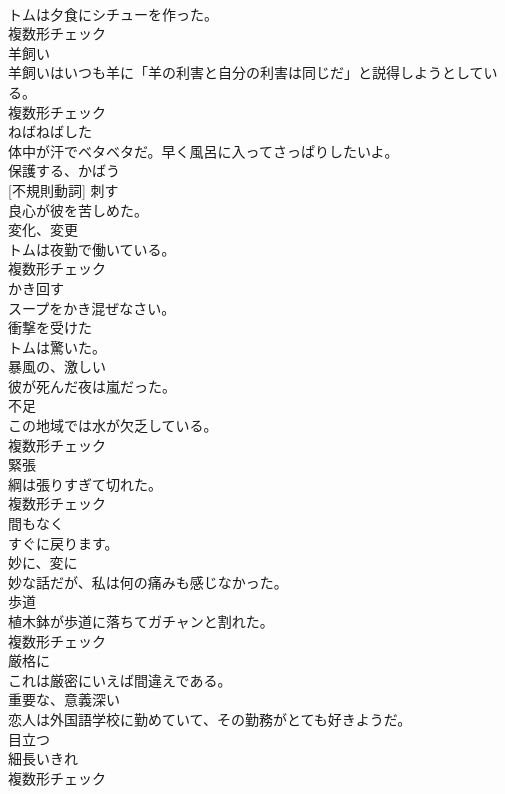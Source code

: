\documentclass[8pt]{extreport}
\begin{document}
\begin{CJK}{UTF8}{min}
\\	トムは夕食にシチューを作った。	
\\	複数形チェック
\\	[名詞]	羊飼い	
\\	羊飼いはいつも羊に「羊の利害と自分の利害は同じだ」と説得しようとしている。	
\\	複数形チェック
\\	[形容詞]	ねばねばした	
\\	体中が汗でベタベタだ。早く風呂に入ってさっぱりしたいよ。	
\\	[動詞]	保護する、かばう	
\\	[動詞] [不規則動詞]	刺す	
\\	良心が彼を苦しめた。	
\\	[名詞]	変化、変更	
\\	トムは夜勤で働いている。	
\\	複数形チェック
\\	[動詞]	かき回す	
\\	スープをかき混ぜなさい。	
\\	[形容詞]	衝撃を受けた	
\\	トムは驚いた。	
\\	[形容詞]	暴風の、激しい	
\\	彼が死んだ夜は嵐だった。	
\\	[名詞]	不足	
\\	この地域では水が欠乏している。	
\\	複数形チェック
\\	[名詞]	緊張	
\\	綱は張りすぎて切れた。	
\\	複数形チェック
\\	[副詞]	間もなく	
\\	すぐに戻ります。	
\\	[副詞]	妙に、変に	
\\	妙な話だが、私は何の痛みも感じなかった。	
\\	[名詞]	歩道	
\\	植木鉢が歩道に落ちてガチャンと割れた。	
\\	複数形チェック
\\	[副詞]	厳格に	
\\	これは厳密にいえば間違えである。	
\\	[形容詞]	重要な、意義深い	
\\	恋人は外国語学校に勤めていて、その勤務がとても好きようだ。	
\\	[形容詞]	目立つ	
\\	[名詞]	細⻑いきれ	
\\	複数形チェック

\end{CJK}
\end{document}
